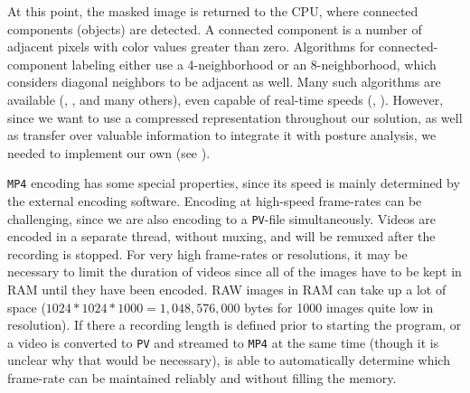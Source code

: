 \documentclass[9pt,lineno]{elife}
\newcommand{\TGrabs}{\protect\path{TGrabs}}
\begin{document}
\begin{appendixbox}
At this point, the masked image is returned to the CPU, where connected components (objects) are detected. A connected component is a number of adjacent pixels with color values greater than zero. Algorithms for connected-component labeling either use a 4-neighborhood or an 8-neighborhood, which considers diagonal neighbors to be adjacent as well. Many such algorithms are available (\cite{4728561}, \cite{chang2003component}, and many others), even capable of real-time speeds (\cite{suzuki2003linear}, \cite{he2009fast}). However, since we want to use a compressed representation throughout our solution, as well as transfer over valuable information to integrate it with posture analysis, we needed to implement our own (see ). 

\texttt{MP4} encoding has some special properties, since its speed is mainly determined by the external encoding software. Encoding at high-speed frame-rates can be challenging, since we are also encoding to a \texttt{PV}-file simultaneously. Videos are encoded in a separate thread, without muxing, and will be remuxed after the recording is stopped. For very high frame-rates or resolutions, it may be necessary to limit the duration of videos since all of the images have to be kept in RAM until they have been encoded. RAW images in RAM can take up a lot of space ($1024*1024*1000=1,048,576,000$ bytes for 1000 images quite low in resolution). If there a recording length is defined prior to starting the program, or a video is converted to \texttt{PV} and streamed to \texttt{MP4} at the same time (though it is unclear why that would be necessary), \TGrabs{} is able to automatically determine which frame-rate can be maintained reliably and without filling the memory.

\end{appendixbox}
\end{document}
